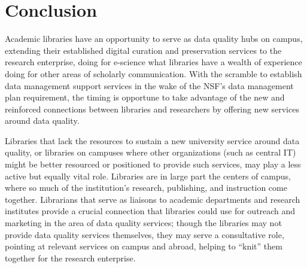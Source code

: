 \documentclass[man,12pt,biblatex]{apa6}
\begin{document}
\section{Conclusion}

Academic libraries have an opportunity to serve as data quality hubs
on campus, extending their established digital curation and
preservation services to the research enterprise, doing for e-science
what libraries have a wealth of experience doing for other areas of
scholarly communication. With the scramble to establish data
management support services in the wake of the NSF's data management
plan requirement, the timing is opportune to take advantage of the new
and reinforced connections between libraries and researchers by
offering new services around data quality.

%

Libraries that lack the resources to sustain a new university service
around data quality, or libraries on campuses where other
organizations (such as central IT) might be better resourced or
positioned to provide such services, may play a less active but
equally vital role. Libraries are in large part the centers of campus,
where so much of the institution's research, publishing, and
instruction come together. Librarians that serve as liaisons to
academic departments and research institutes provide a crucial
connection that libraries could use for outreach and marketing in the
area of data quality services; though the libraries may not provide
data quality services themselves, they may serve a consultative role,
pointing at relevant services on campus and abroad, helping to
``knit'' them together for the research enterprise.
\end{document}
